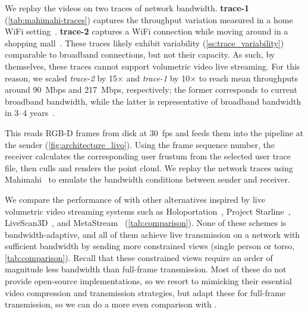 %
We replay the videos on two traces of network bandwidth.
%
\textbf{trace-1} (\cref{tab:mahimahi-traces}) captures the throughput variation measured in a home WiFi setting~\cite{laia}.
%
\textbf{trace-2} captures a WiFi connection while moving around in a shopping mall~\cite{dashlet}.
%
These traces likely exhibit variability (\cref{ss:trace_variability}) comparable to broadband connections, but not their capacity.
%
As such, by themselves, these traces cannot support volumetric video live streaming.
%
For this reason, we scaled \textit{trace-2} by 15$\times$ and \textit{trace-1} by 10$\times$ to reach mean throughputs around 90~Mbps and 217~Mbps, respectively; the former corresponds to current broadband bandwidth, while the latter is representative of broadband bandwidth in 3--4 years~\cite{cisco_whitepaper}.

This reads RGB-D frames from disk at 30~fps and feeds them into the \livo pipeline at the sender (\cref{fig:architecture_livo}).
%
%
Using the frame sequence number, the receiver calculates the corresponding user frustum from the selected user trace file, then culls and renders the point cloud.
%
We replay the network traces using Mahimahi~\cite{mahimahi} to emulate the bandwidth conditions between sender and receiver.

%
We compare the performance of \livo with other alternatives inspired by live volumetric video streaming systems such as Holoportation~\cite{holoportation}, Project Starline~\cite{starline}, LiveScan3D~\cite{livescan3d}, and MetaStream~\cite{metastream} (\cref{tab:comparison}).
%
None of these schemes is bandwidth-adaptive, and all of them achieve live transmission on a network with sufficient bandwidth by sending more constrained views (\eg single person or torso, \cref{tab:comparison}).
%
Recall that these constrained views require an order of magnitude less bandwidth than full-frame transmission.
%
Most of these do not provide open-source implementations, so we resort to mimicking their essential video compression and transmission strategies, but adapt these for full-frame transmission, so we can do a more even comparison with \livo.
%
%

